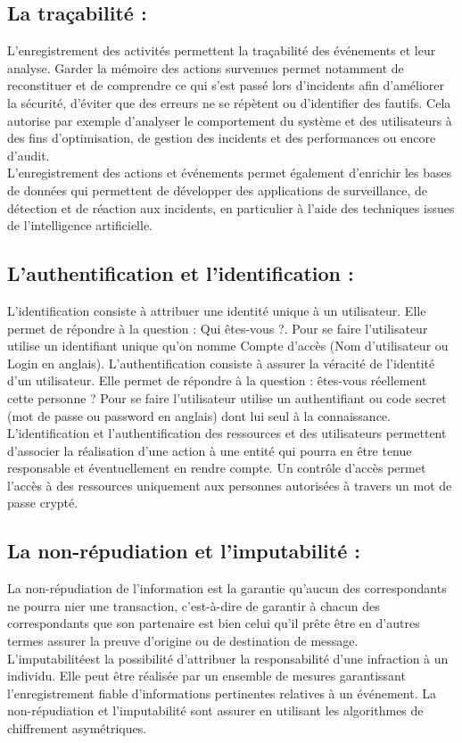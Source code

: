 \subsection{La traçabilité : }
L’enregistrement des activités permettent la traçabilité des événements et leur analyse. Garder la mémoire des actions survenues permet notamment de reconstituer et de comprendre ce qui s’est passé lors d’incidents afin d’améliorer la sécurité, d’éviter que des erreurs ne se répètent ou d’identifier des fautifs. Cela autorise par exemple d’analyser le comportement du système et des utilisateurs à des fins d’optimisation, de gestion des incidents et des performances ou encore d’audit.\\
L’enregistrement des actions et événements permet également d’enrichir les bases de données qui permettent de développer des applications de surveillance, de détection et de réaction aux incidents, en particulier à l’aide des techniques issues de l’intelligence artificielle.
\subsection{L’authentification et l’identification :}
L'identification consiste à attribuer une identité unique à un utilisateur. Elle permet de répondre à la question : Qui êtes-vous ?\cite{ref5}. Pour se faire l'utilisateur utilise un identifiant unique qu’on nomme Compte d'accès (Nom d'utilisateur ou Login en anglais). L’authentification consiste à assurer la véracité de l'identité d'un utilisateur. Elle permet de répondre à la question : êtes-vous réellement cette personne ? \cite{ref5} Pour se faire l’utilisateur utilise un authentifiant ou code secret (mot de passe ou password en anglais) dont lui seul à la connaissance.\\
L’identification et l’authentification des ressources et des utilisateurs permettent d’associer la réalisation d’une action à une entité qui pourra en être tenue responsable et éventuellement en rendre compte. Un contrôle d'accès permet l'accès à des ressources uniquement aux personnes autorisées à travers un mot de passe crypté.
\authenti
\subsection{La non-répudiation et l’imputabilité : }
La non-répudiation de l'information est la garantie qu'aucun des correspondants ne pourra nier une transaction, c'est-à-dire de garantir à chacun des correspondants que son partenaire est bien celui qu’il prête être en d’autres termes assurer la preuve d’origine ou de destination de message.\\
L’imputabilitéest la possibilité d’attribuer la responsabilité d’une infraction à un individu. Elle peut être réalisée par un ensemble de mesures garantissant l’enregistrement fiable d’informations pertinentes relatives à un événement. La non-répudiation et l’imputabilité sont assurer en utilisant les algorithmes de chiffrement asymétriques.
